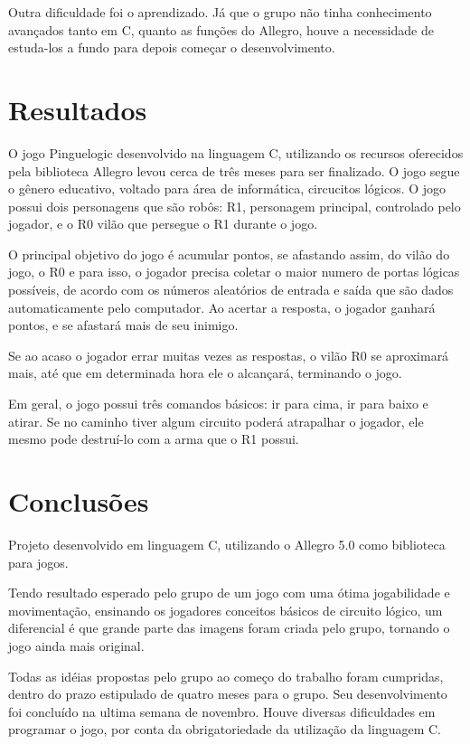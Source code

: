 \documentclass[fncyhd,a4paper]{article}
\begin{document}
	\large Outra dificuldade foi o aprendizado. Já que o grupo não tinha conhecimento avançados tanto em C, quanto as funções do Allegro, houve a necessidade de estuda-los a fundo para 
	depois começar o desenvolvimento.

	
	
	
	\section{\Large Resultados}
	\large O jogo Pinguelogic desenvolvido na linguagem C, utilizando os recursos oferecidos pela biblioteca Allegro levou cerca de três meses para ser finalizado. O jogo segue o gênero 
	educativo, voltado para área de informática, circucitos lógicos. O jogo possui dois personagens que são robôs: R1, personagem principal, controlado pelo jogador, e o R0 vilão que persegue
	o R1 durante o jogo. 
	
	\large O principal objetivo do jogo é acumular pontos, se afastando assim, do vilão do jogo, o R0 e para isso, o jogador precisa coletar o maior numero de portas lógicas 
	possíveis, de acordo com os números aleatórios de entrada e saída que são dados automaticamente pelo computador.  Ao acertar a resposta, o jogador ganhará pontos, e se afastará mais
	de seu inimigo.
	
	\large Se ao acaso o jogador errar muitas vezes as respostas, o vilão R0 se aproximará mais, até que em determinada hora ele o alcançará, terminando o jogo.
	
	\large Em geral, o jogo possui três comandos básicos: ir para cima, ir para baixo e atirar. Se no caminho tiver algum circuito poderá atrapalhar o jogador, ele mesmo pode destruí-lo 
	com a arma que o R1 possui.
	
	
	
	
	
	\section{\Large Conclusões}
	
	\large Projeto desenvolvido em linguagem C, utilizando o Allegro 5.0 como biblioteca para jogos.

	\large Tendo resultado esperado pelo grupo de um jogo com uma ótima jogabilidade e movimentação, ensinando os jogadores conceitos básicos de circuito lógico, um diferencial é que grande 
	parte das imagens foram criada pelo grupo, tornando o jogo ainda mais original.
	
	\large Todas as idéias propostas pelo grupo ao começo do trabalho foram cumpridas, dentro do prazo estipulado de quatro meses para o grupo. Seu desenvolvimento foi concluído na ultima semana
	de novembro. Houve diversas dificuldades em programar o jogo, por conta da obrigatoriedade da utilização da linguagem C.
	
\end{document}
